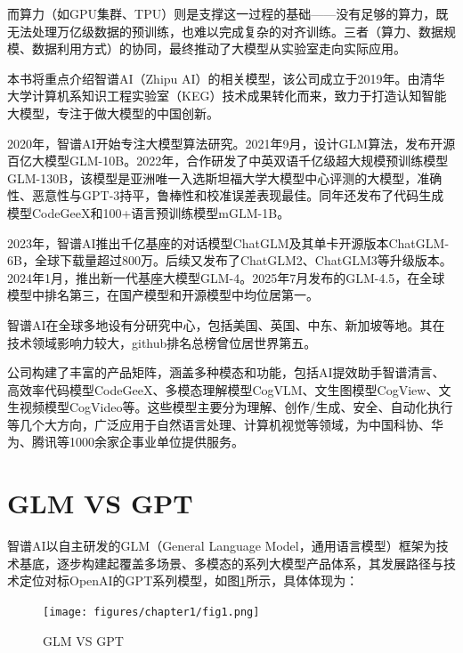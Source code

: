 而算力（如GPU集群、TPU）则是支撑这一过程的基础——没有足够的算力，既无法处理万亿级数据的预训练，也难以完成复杂的对齐训练。三者（算力、数据规模、数据利用方式）的协同，最终推动了大模型从实验室走向实际应用。

本书将重点介绍智谱AI（Zhipu AI）的相关模型，该公司成立于2019年。由清华大学计算机系知识工程实验室（KEG）技术成果转化而来，致力于打造认知智能大模型，专注于做大模型的中国创新。

2020年，智谱AI开始专注大模型算法研究。2021年9月，设计GLM算法，发布开源百亿大模型GLM-10B。2022年，合作研发了中英双语千亿级超大规模预训练模型GLM-130B，该模型是亚洲唯一入选斯坦福大学大模型中心评测的大模型，准确性、恶意性与GPT-3持平，鲁棒性和校准误差表现最佳。同年还发布了代码生成模型CodeGeeX和100+语言预训练模型mGLM-1B。

2023年，智谱AI推出千亿基座的对话模型ChatGLM及其单卡开源版本ChatGLM-6B，全球下载量超过800万。后续又发布了ChatGLM2、ChatGLM3等升级版本。2024年1月，推出新一代基座大模型GLM-4。2025年7月发布的GLM-4.5，在全球模型中排名第三，在国产模型和开源模型中均位居第一。

智谱AI在全球多地设有分研究中心，包括美国、英国、中东、新加坡等地。其在技术领域影响力较大，github排名总榜曾位居世界第五。

公司构建了丰富的产品矩阵，涵盖多种模态和功能，包括AI提效助手智谱清言、高效率代码模型CodeGeeX、多模态理解模型CogVLM、文生图模型CogView、文生视频模型CogVideo等。这些模型主要分为理解、创作/生成、安全、自动化执行等几个大方向，广泛应用于自然语言处理、计算机视觉等领域，为中国科协、华为、腾讯等1000余家企事业单位提供服务。


\section{GLM VS GPT}

智谱AI以自主研发的GLM（General Language Model，通用语言模型）框架为技术基底，逐步构建起覆盖多场景、多模态的系列大模型产品体系，其发展路径与技术定位对标OpenAI的GPT系列模型，如图\ref{fig:glmvsgpt}所示，具体体现为：

\begin{figure}[H]
	\centering
	\texttt{[image: figures/chapter1/fig1.png]}
	\caption{GLM VS GPT}
	\label{fig:glmvsgpt}
\end{figure}

